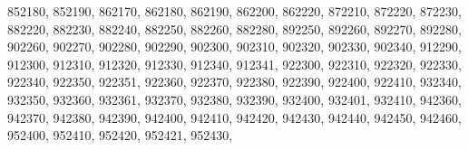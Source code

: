 \textquotesingle{}852180\textquotesingle{}, \textquotesingle{}852190\textquotesingle{}, \textquotesingle{}862170\textquotesingle{}, \textquotesingle{}862180\textquotesingle{}, \textquotesingle{}862190\textquotesingle{}, \textquotesingle{}862200\textquotesingle{}, \textquotesingle{}862220\textquotesingle{}, \textquotesingle{}872210\textquotesingle{}, \textquotesingle{}872220\textquotesingle{}, \textquotesingle{}872230\textquotesingle{}, \textquotesingle{}882220\textquotesingle{}, \textquotesingle{}882230\textquotesingle{}, \textquotesingle{}882240\textquotesingle{}, \textquotesingle{}882250\textquotesingle{}, \textquotesingle{}882260\textquotesingle{}, \textquotesingle{}882280\textquotesingle{}, \textquotesingle{}892250\textquotesingle{}, \textquotesingle{}892260\textquotesingle{}, \textquotesingle{}892270\textquotesingle{}, \textquotesingle{}892280\textquotesingle{}, \textquotesingle{}902260\textquotesingle{}, \textquotesingle{}902270\textquotesingle{}, \textquotesingle{}902280\textquotesingle{}, \textquotesingle{}902290\textquotesingle{}, \textquotesingle{}902300\textquotesingle{}, \textquotesingle{}902310\textquotesingle{}, \textquotesingle{}902320\textquotesingle{}, \textquotesingle{}902330\textquotesingle{}, \textquotesingle{}902340\textquotesingle{}, \textquotesingle{}912290\textquotesingle{}, \textquotesingle{}912300\textquotesingle{}, \textquotesingle{}912310\textquotesingle{}, \textquotesingle{}912320\textquotesingle{}, \textquotesingle{}912330\textquotesingle{}, \textquotesingle{}912340\textquotesingle{}, \textquotesingle{}912341\textquotesingle{}, \textquotesingle{}922300\textquotesingle{}, \textquotesingle{}922310\textquotesingle{}, \textquotesingle{}922320\textquotesingle{}, \textquotesingle{}922330\textquotesingle{}, \textquotesingle{}922340\textquotesingle{}, \textquotesingle{}922350\textquotesingle{}, \textquotesingle{}922351\textquotesingle{}, \textquotesingle{}922360\textquotesingle{}, \textquotesingle{}922370\textquotesingle{}, \textquotesingle{}922380\textquotesingle{}, \textquotesingle{}922390\textquotesingle{}, \textquotesingle{}922400\textquotesingle{}, \textquotesingle{}922410\textquotesingle{}, \textquotesingle{}932340\textquotesingle{}, \textquotesingle{}932350\textquotesingle{}, \textquotesingle{}932360\textquotesingle{}, \textquotesingle{}932361\textquotesingle{}, \textquotesingle{}932370\textquotesingle{}, \textquotesingle{}932380\textquotesingle{}, \textquotesingle{}932390\textquotesingle{}, \textquotesingle{}932400\textquotesingle{}, \textquotesingle{}932401\textquotesingle{}, \textquotesingle{}932410\textquotesingle{}, \textquotesingle{}942360\textquotesingle{}, \textquotesingle{}942370\textquotesingle{}, \textquotesingle{}942380\textquotesingle{}, \textquotesingle{}942390\textquotesingle{}, \textquotesingle{}942400\textquotesingle{}, \textquotesingle{}942410\textquotesingle{}, \textquotesingle{}942420\textquotesingle{}, \textquotesingle{}942430\textquotesingle{}, \textquotesingle{}942440\textquotesingle{}, \textquotesingle{}942450\textquotesingle{}, \textquotesingle{}942460\textquotesingle{}, \textquotesingle{}952400\textquotesingle{}, \textquotesingle{}952410\textquotesingle{}, \textquotesingle{}952420\textquotesingle{}, \textquotesingle{}952421\textquotesingle{}, \textquotesingle{}952430\textquotesingle{}, 